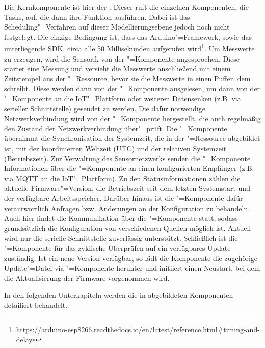 Die Kernkomponente ist hier der .
Dieser ruft die einzelnen Komponenten, die Tasks, auf, die dann ihre Funktion ausführen.
Dabei ist das Scheduling"=Verfahren auf dieser Modellierungsebene jedoch noch nicht festgelegt.
Die einzige Bedingung ist, dass das Arduino"=Framework, sowie das unterliegende SDK, circa alle 50 Millisekunden aufgerufen wird\footnote{\url{https://arduino-esp8266.readthedocs.io/en/latest/reference.html\#timing-and-delays}}.
Um Messwerte zu erzeugen, wird die Sensorik von der "=Komponente angesprochen.
Diese startet eine Messung und versieht die Messwerte anschließend mit einem Zeitstempel aus der "=Ressource, bevor sie die Messwerte in einen Puffer, dem  schreibt.
Diese werden dann von der "=Komponente ausgelesen, um dann von der "=Komponente an die IoT"=Plattform oder weiteren Datensenken (z.B. via serieller Schnittstelle) gesendet zu werden.
Die dafür notwendige Netzwerkverbindung wird von der "=Komponente hergestellt, die auch regelmäßig den Zustand der Netzwerkverbindung über"=prüft.
Die "=Komponente übernimmt die Synchronisation der Systemzeit, die in der "=Ressource abgebildet ist, mit der koordinierten Weltzeit (UTC) und der relativen Systemzeit (Betriebszeit).
Zur Verwaltung des Sensornetzwerks senden die "=Komponente Informationen über die "=Komponente an einen konfigurierten Empfänger (z.B. via MQTT an die IoT"=Plattform).
Zu den Statusinformationen zählen die aktuelle Firmware"=Version, die Betriebszeit seit dem letzten Systemstart und der verfügbare Arbeitsspeicher.
Darüber hinaus ist die "=Komponente dafür verantwortlich Anfragen bzw. Änderungen an der Konfiguration zu behandeln.
Auch hier findet die Kommunikation über die "=Komponente statt, sodass grundsätzlich die Konfiguration von verschiedenen Quellen möglich ist.
Aktuell wird nur die serielle Schnittstelle zuverlässig unterstützt.
Schließlich ist die "=Komponente für das zyklische Überprüfen auf ein verfügbares Update zuständig.
Ist ein neue Version verfügbar, so lädt die Komponente die zugehörige Update"=Datei via "=Komponente herunter und initiiert einen Neustart, bei dem die Aktualisierung der Firmware vorgenommen wird.

In den folgenden Unterkapiteln werden die in  abgebildeten Komponenten detailiert behandelt.

